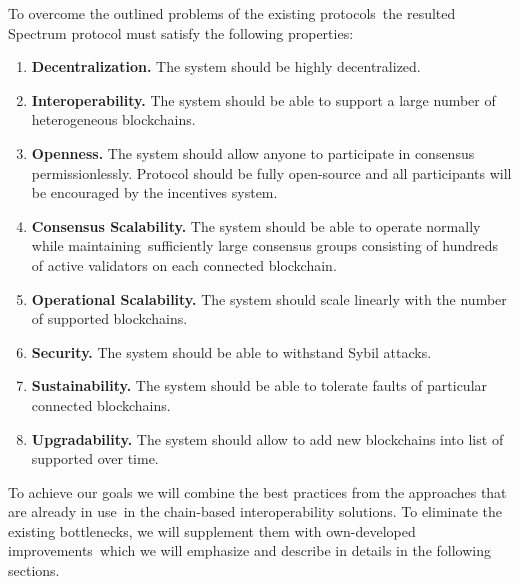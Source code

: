 To overcome the outlined problems of the existing protocols\
the resulted Spectrum protocol must satisfy the following properties:

\begin{enumerate}
    \item \textbf{Decentralization.} The system should be highly decentralized.
    \item \textbf{Interoperability.} The system should be able to support a large number of heterogeneous blockchains.
    \item \textbf{Openness.} The system should allow anyone to participate in consensus permissionlessly.
    Protocol should be fully open-source and all participants will be encouraged by the incentives system.
    \item \textbf{Consensus Scalability.} The system should be able to operate normally while maintaining\
    sufficiently large consensus groups consisting of hundreds of active validators on each connected blockchain.
    \item \textbf{Operational Scalability.} The system should scale linearly with the number of supported blockchains.
    \item \textbf{Security.} The system should be able to withstand Sybil attacks.
    \item \textbf{Sustainability.} The system should be able to tolerate faults of particular connected blockchains.
    \item \textbf{Upgradability.} The system should allow to add new blockchains into list of supported over time.
\end{enumerate}

To achieve our goals we will combine the best practices from the approaches that are already in use\
in the chain-based interoperability solutions.
To eliminate the existing bottlenecks, we will supplement them with own-developed improvements\
which we will emphasize and describe in details in the following sections.